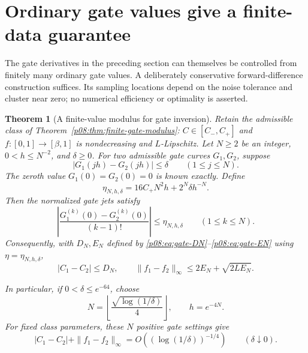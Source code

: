 \documentclass[11pt,letterpaper]{article}
\newtheorem{theorem}{Theorem}[section]
\theoremstyle{definition}
\theoremstyle{remark}
\newcommand{\1}{\mathbf 1}
\begin{document}
\section{Ordinary gate values give a finite-data guarantee}
\label{p08:sec:gate-value-stability}

The gate derivatives in the preceding section can themselves be controlled
from finitely many ordinary gate values.  A deliberately conservative
forward-difference construction suffices.  Its sampling locations depend on
the noise tolerance and cluster near zero; no numerical efficiency or
optimality is asserted.

\begin{theorem}[A finite-value modulus for gate inversion]
\label{p08:thm:finite-gate-values}
Retain the admissible class of Theorem~\ref{p08:thm:finite-gate-modulus}:
$C\in[C_-,C_+]$ and $f:[0,1]\to[\beta,1]$ is nondecreasing and
$L$-Lipschitz. Let $N\geq2$ be an integer, $0<h\leq N^{-2}$, and $\delta\geq0$.
For two admissible gate curves $G_1,G_2$, suppose
\begin{equation}\label{p08:eq:gate-value-data}
 |G_1(jh)-G_2(jh)|\leq\delta\qquad(1\leq j\leq N).
\end{equation}
The zeroth value $G_1(0)=G_2(0)=0$ is known exactly.  Define
\begin{equation}\label{p08:eq:gate-value-jet-error}
 \eta_{N,h,\delta}
 =16C_+N^2h+2^N\delta h^{-N}.
\end{equation}
Then the normalized gate jets satisfy
\begin{equation}\label{p08:eq:gate-value-to-jet}
 \left|\frac{G_1^{(k)}(0)-G_2^{(k)}(0)}{(k-1)!}\right|
 \leq\eta_{N,h,\delta}\qquad(1\leq k\leq N).
\end{equation}
Consequently, with $D_N,E_N$ defined by
\eqref{p08:eq:gate-DN}--\eqref{p08:eq:gate-EN} using
$\eta=\eta_{N,h,\delta}$,
\begin{equation}\label{p08:eq:gate-value-profile-bound}
 |C_1-C_2|\leq D_N,\qquad
 \|f_1-f_2\|_\infty\leq2E_N+\sqrt{2LE_N}.
\end{equation}

In particular, if $0<\delta\leq e^{-64}$, choose
\begin{equation}\label{p08:eq:gate-value-design}
 N=\left\lfloor\frac{\sqrt{\log(1/\delta)}}4\right\rfloor,
 \qquad h=e^{-4N}.
\end{equation}
For fixed class parameters, these $N$ positive gate settings give
\begin{equation}\label{p08:eq:gate-value-log-rate}
 |C_1-C_2|+\|f_1-f_2\|_\infty
 =O\left((\log(1/\delta))^{-1/4}\right)
 \qquad(\delta\downarrow0).
\end{equation}
\end{theorem}
\end{document}
